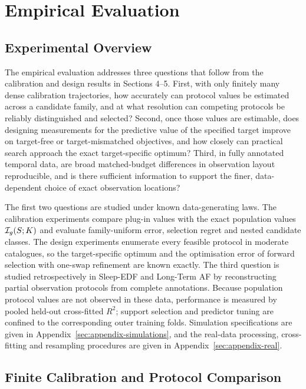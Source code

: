 \section{Empirical Evaluation}
\label{sec:synthetic}

\subsection{Experimental Overview}
\label{sec:empirical-overview}

The empirical evaluation addresses three questions that follow from the calibration and design results in Sections 4--5. First, with only finitely many dense calibration trajectories, how accurately can protocol values be estimated across a candidate family, and at what resolution can competing protocols be reliably distinguished and selected? Second, once those values are estimable, does designing measurements for the predictive value of the specified target improve on target-free or target-mismatched objectives, and how closely can practical search approach the exact target-specific optimum? Third, in fully annotated temporal data, are broad matched-budget differences in observation layout reproducible, and is there sufficient information to support the finer, data-dependent choice of exact observation locations?


The first two questions are studied under known data-generating laws. The
calibration experiments compare plug-in values with the exact population values
$\mathcal{I}_g(S;K)$ and evaluate family-uniform error, selection regret and nested
candidate classes. The design experiments enumerate every feasible protocol in
moderate catalogues, so the target-specific optimum and the optimisation error
of forward selection with one-swap refinement are known exactly. The third
question is studied retrospectively in Sleep-EDF and Long-Term AF by
reconstructing partial observation protocols from complete annotations. Because
population protocol values are not observed in these data, performance is
measured by pooled held-out cross-fitted $R^2$; support selection and predictor
tuning are confined to the corresponding outer training folds. Simulation
specifications are given in Appendix~\ref{sec:appendix-simulations}, and the
real-data processing, cross-fitting and resampling procedures are given in
Appendix~\ref{sec:appendix-real}.



\subsection{Finite Calibration and Protocol Comparison}
\label{sec:simulation-evidence}
\label{sec:calibration-regret}

